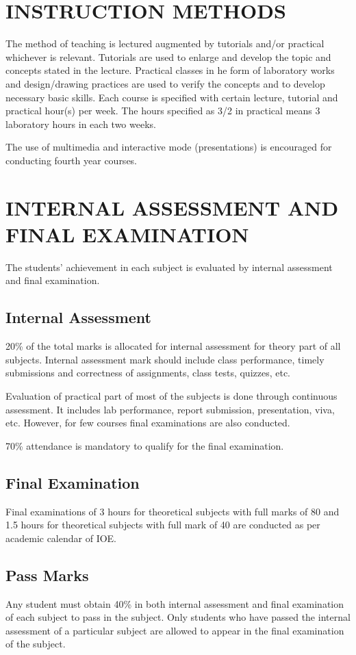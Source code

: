 \section{\uppercase{Instruction Methods}}
The method of teaching is lectured augmented by tutorials and/or practical whichever is relevant. Tutorials are used to enlarge and develop the topic and concepts stated in the lecture. Practical classes in he form of laboratory works and design/drawing practices are used to verify the concepts and to develop necessary basic skills. Each course is specified with certain lecture, tutorial and practical hour(s) per week. The hours specified as 3/2 in practical means 3 laboratory hours in each two weeks. 
\par
The use of multimedia and interactive mode (presentations) is encouraged for conducting fourth year courses.

\section{\uppercase{Internal Assessment and Final Examination}}
The students' achievement in each subject is evaluated by internal assessment and final examination.

\subsection{Internal Assessment}
20\% of the total marks is allocated for internal assessment for theory part of all subjects. Internal assessment mark should include class performance, timely submissions and correctness of assignments, class tests, quizzes, etc.
\par
Evaluation of practical part of most of the subjects is done through continuous assessment. It includes lab performance, report submission, presentation, viva, etc. However, for few courses final examinations are also conducted.
\par
70\%  attendance is mandatory to qualify for the final examination.

\subsection{Final Examination}
Final examinations of 3 hours for theoretical subjects with full marks of 80 and 1.5 hours for theoretical subjects with full mark of 40 are conducted as per academic calendar of IOE.

\subsection{Pass Marks}
Any student must obtain 40\% in both internal assessment and final examination of each subject to pass in the subject. Only students who have passed the internal assessment of a particular subject are allowed to appear in the final examination of the subject.


